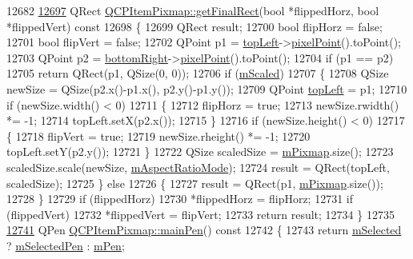 \begin{DoxyCode}
12682 
\hypertarget{a00115_source_l12697}{}\hyperlink{a00037_a245ef0c626cab7096a810442f2f6a2d9}{12697} QRect \hyperlink{a00037_a245ef0c626cab7096a810442f2f6a2d9}{QCPItemPixmap::getFinalRect}(\textcolor{keywordtype}{bool} *flippedHorz, \textcolor{keywordtype}{bool} *flippedVert)\textcolor{keyword}{ const}
12698 \textcolor{keyword}{}\{
12699   QRect result;
12700   \textcolor{keywordtype}{bool} flipHorz = \textcolor{keyword}{false};
12701   \textcolor{keywordtype}{bool} flipVert = \textcolor{keyword}{false};
12702   QPoint p1 = \hyperlink{a00037_a43c281ef6ad46f3cf04f365289abe51a}{topLeft}->\hyperlink{a00038_ae490f9c76ee2ba33752c495d3b6e8fb5}{pixelPoint}().toPoint();
12703   QPoint p2 = \hyperlink{a00037_abcc38063f9502b876bf6615c45cc0994}{bottomRight}->\hyperlink{a00038_ae490f9c76ee2ba33752c495d3b6e8fb5}{pixelPoint}().toPoint();
12704   \textcolor{keywordflow}{if} (p1 == p2)
12705     \textcolor{keywordflow}{return} QRect(p1, QSize(0, 0));
12706   \textcolor{keywordflow}{if} (\hyperlink{a00037_a8fe670a529cd46a9b8afd9fc1203bc3f}{mScaled})
12707   \{
12708     QSize newSize = QSize(p2.x()-p1.x(), p2.y()-p1.y());
12709     QPoint \hyperlink{a00037_a43c281ef6ad46f3cf04f365289abe51a}{topLeft} = p1;
12710     \textcolor{keywordflow}{if} (newSize.width() < 0)
12711     \{
12712       flipHorz = \textcolor{keyword}{true};
12713       newSize.rwidth() *= -1;
12714       topLeft.setX(p2.x());
12715     \}
12716     \textcolor{keywordflow}{if} (newSize.height() < 0)
12717     \{
12718       flipVert = \textcolor{keyword}{true};
12719       newSize.rheight() *= -1;
12720       topLeft.setY(p2.y());
12721     \}
12722     QSize scaledSize = \hyperlink{a00037_a1396cce7f26c7b8e9512906284380c4d}{mPixmap}.size();
12723     scaledSize.scale(newSize, \hyperlink{a00037_a8dc6b6c1e106ac523efae22d5fe55bab}{mAspectRatioMode});
12724     result = QRect(topLeft, scaledSize);
12725   \} \textcolor{keywordflow}{else}
12726   \{
12727     result = QRect(p1, \hyperlink{a00037_a1396cce7f26c7b8e9512906284380c4d}{mPixmap}.size());
12728   \}
12729   \textcolor{keywordflow}{if} (flippedHorz)
12730     *flippedHorz = flipHorz;
12731   \textcolor{keywordflow}{if} (flippedVert)
12732     *flippedVert = flipVert;
12733   \textcolor{keywordflow}{return} result;
12734 \}
12735 
\hypertarget{a00115_source_l12741}{}\hyperlink{a00037_af21085516585c475dc9d839e7f377233}{12741} QPen \hyperlink{a00037_af21085516585c475dc9d839e7f377233}{QCPItemPixmap::mainPen}()\textcolor{keyword}{ const}
12742 \textcolor{keyword}{}\{
12743   \textcolor{keywordflow}{return} \hyperlink{a00022_a4bdb3457dad1d268c0f78a44152b9645}{mSelected} ? \hyperlink{a00037_a0949e5bb6a261fc4e9668e28e2effcfa}{mSelectedPen} : \hyperlink{a00037_acfee1124eb51a1887aaf8de10777c7a1}{mPen};

\end{DoxyCode}
